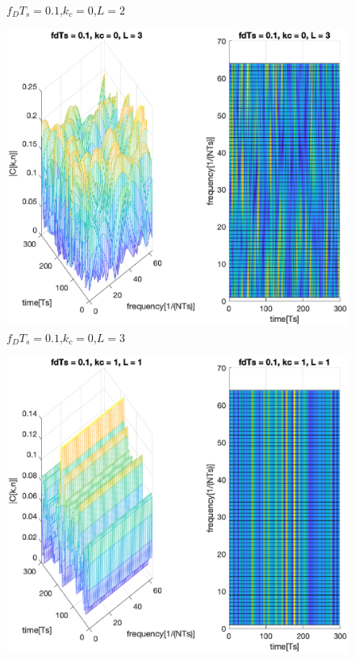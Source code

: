 \documentclass[conference]{IEEEtran}
\begin{document}
\begin{appendices}
\begin{figure}[H]
        \caption{$f_{D}T_{s}=0.1$,$k_{c}=0$,$L=2$}
        \label{01_0_2}
    \end{figure}
    \begin{figure}[H]
        \centering
        \includegraphics[width=\linewidth]{Task2/01_0_3.eps}
        \caption{$f_{D}T_{s}=0.1$,$k_{c}=0$,$L=3$}
        \label{01_0_3}
    \end{figure}
    \begin{figure}[H]
        \centering
        \includegraphics[width=\linewidth]{Task2/01_1_1.eps}

\end{figure}
\end{appendices}
\end{document}
